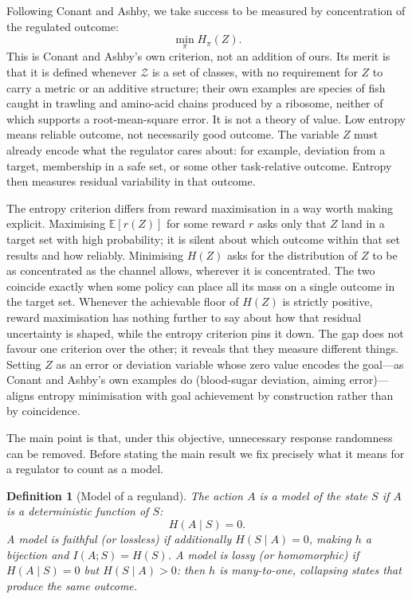 \documentclass[11pt]{article}
\newtheorem{definition}{Definition}
\theoremstyle{remark}
\newcommand{\Zcal}{\mathcal Z}
\newcommand{\1}{\mathbb 1}
\begin{document}
Following Conant and Ashby, we take success to be measured by concentration of the regulated outcome:
\begin{equation}
    \min_{\pi} H_\pi(Z).
    \label{eq:min-entropy-objective}
\end{equation}
This is Conant and Ashby's own criterion, not an addition of ours. Its merit is that it is defined whenever $\Zcal$ is a set of classes, with no requirement for $Z$ to carry a metric or an additive structure; their own examples are species of fish caught in trawling and amino-acid chains produced by a ribosome, neither of which supports a root-mean-square error. It is not a theory of value. Low entropy means reliable outcome, not necessarily good outcome. The variable $Z$ must already encode what the regulator cares about: for example, deviation from a target, membership in a safe set, or some other task-relative outcome. Entropy then measures residual variability in that outcome.

The entropy criterion differs from reward maximisation in a way worth making explicit. Maximising $\mathbb{E}[r(Z)]$ for some reward $r$ asks only that $Z$ land in a target set with high probability; it is silent about which outcome within that set results and how reliably. Minimising $H(Z)$ asks for the distribution of $Z$ to be as concentrated as the channel allows, wherever it is concentrated. The two coincide exactly when some policy can place all its mass on a single outcome in the target set. Whenever the achievable floor of $H(Z)$ is strictly positive, reward maximisation has nothing further to say about how that residual uncertainty is shaped, while the entropy criterion pins it down. The gap does not favour one criterion over the other; it reveals that they measure different things. Setting $Z$ as an error or deviation variable whose zero value encodes the goal---as Conant and Ashby's own examples do (blood-sugar deviation, aiming error)---aligns entropy minimisation with goal achievement by construction rather than by coincidence.

The main point is that, under this objective, unnecessary response randomness can be removed. Before stating the main result we fix precisely what it means for a regulator to count as a model.

\begin{definition}[Model of a reguland]
\label{def:model}
The action $A$ is a \emph{model} of the state $S$ if $A$ is a deterministic function of $S$:
\[
H(A\mid S) = 0.
\]
A model is \emph{faithful} (or \emph{lossless}) if additionally $H(S\mid A) = 0$, making $h$ a bijection and $I(A;S)=H(S)$. A model is \emph{lossy} (or \emph{homomorphic}) if $H(A\mid S)=0$ but $H(S\mid A)>0$: then $h$ is many-to-one, collapsing states that produce the same outcome.
\end{definition}
\end{document}
